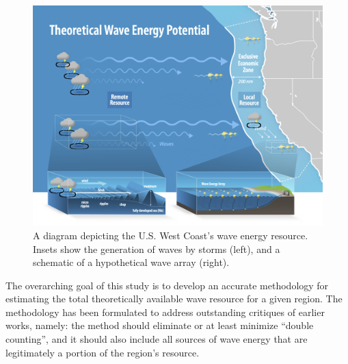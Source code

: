 \begin{figure}[ht]
\centering
\includegraphics[width=\linewidth]{../fig/NREL-water-NatureEnergyGraphic-Levi-FY21-jfrenzl-v5.png}
\caption{A diagram depicting the U.S. West Coast's wave energy resource. Insets show the generation of waves by storms (left), and a schematic of a hypothetical wave array (right).}
\label{fig:diagram:west-eez}
\end{figure}

The overarching goal of this study is to develop an accurate methodology for estimating the total theoretically available wave resource for a given region. The methodology has been formulated to address outstanding critiques of earlier works, namely: the method should eliminate or at least minimize ``double counting'', and it should also include all sources of wave energy that are legitimately a portion of the region's resource.

